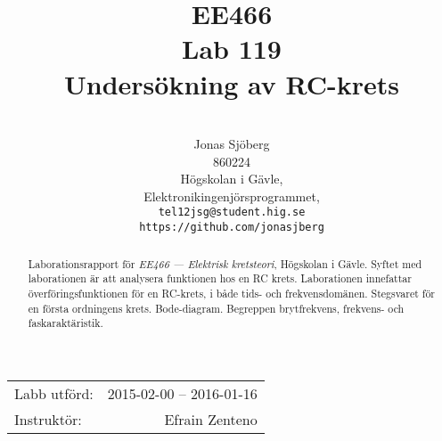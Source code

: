 \documentclass[11pt,a4paper]{article}
\title{EE466 \\ Lab 119 \\ Undersökning av RC-krets}
\author{                                 \\
  Jonas Sjöberg                          \\
  860224                                 \\
  Högskolan i Gävle,                     \\
  Elektronikingenjörsprogrammet,         \\
  \texttt{tel12jsg@student.hig.se}       \\
  \texttt{https://github.com/jonasjberg} \\
}
\date{}
\begin{document}
\maketitle

\begin{center}
  \begin{tabular}{l r}
    Labb utförd: & 2015-02-00 -- 2016-01-16\\
    Instruktör:  & Efrain Zenteno
  \end{tabular}
\end{center}

\medskip

\begin{abstract}
  \begin{center}
    Laborationsrapport för \emph{EE466 --- Elektrisk kretsteori}, Högskolan i
    Gävle. Syftet med laborationen är att analysera funktionen hos en RC krets.
    Laborationen innefattar överföringsfunktionen för en RC-krets, i både tids-
    och frekvensdomänen. Stegsvaret för en första ordningens krets.
    Bode-diagram.  Begreppen brytfrekvens, frekvens- och faskaraktäristik.
  \end{center}
\end{abstract}

\newpage
\setcounter{tocdepth}{3}
\tableofcontents

\newpage





\newpage



\newpage

\end{document}
